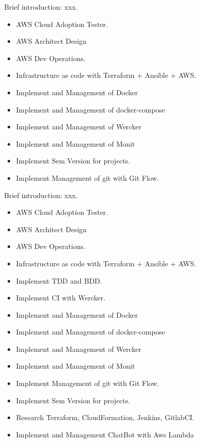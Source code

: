 \documentclass{resume}
\begin{document}
Brief introduction: xxx.
\begin{itemize}
  \item AWS Cloud Adoption Tester.
  \item AWS Architect Design
  \item AWS Dev Operations.
  \item Infrastructure as code with Terraform + Ansible + AWS.
  \item Implement and Management of Docker
  \item Implement and Management of docker-compose
  \item Implement and Management of Wercker
  \item Implement and Management of Monit
  \item Implement Sem Version for projects.
  \item Implement Management of git with Git Flow.
\end{itemize}

Brief introduction: xxx.
\begin{itemize}
  \item AWS Cloud Adoption Tester.
  \item AWS Architect Design
  \item AWS Dev Operations.
  \item Infrastructure as code with Terraform + Ansible + AWS.
  \item Implement TDD and BDD.
  \item Implement CI with Wercker.
  \item Implement and Management of Docker
  \item Implement and Management of docker-compose
  \item Implement and Management of Wercker
  \item Implement and Management of Monit
  \item Implement Management of git with Git Flow.
  \item Implement Sem Version for projects.
  \item Research Terraform, CloudFormation, Jenkins, GitlabCI.
  \item Implement and Management ChatBot with Aws Lambda
\end{itemize}
\end{document}
